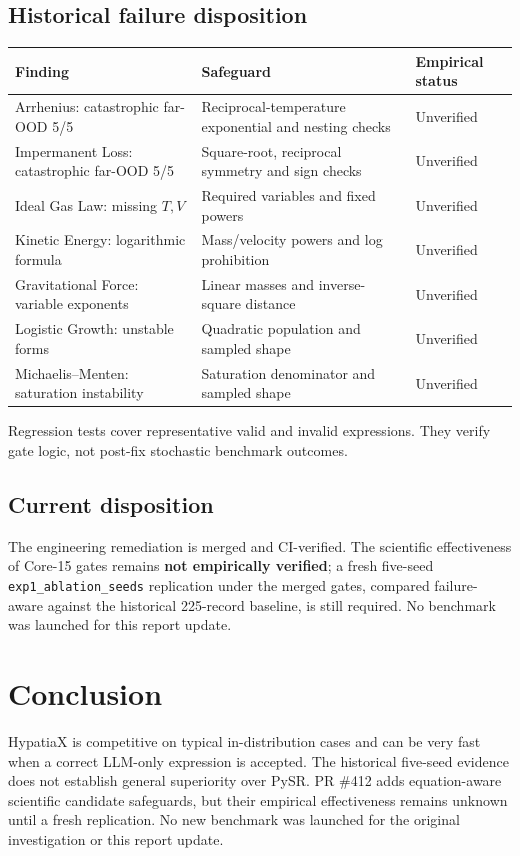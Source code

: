 \documentclass[11pt,a4paper]{article}
\begin{document}
\subsection{Historical failure disposition}
\begin{center}
\small
\begin{tabularx}{\textwidth}{p{}X p{}}
\toprule
Finding & Safeguard & Empirical status\\
\midrule
Arrhenius: catastrophic far-OOD 5/5 & Reciprocal-temperature exponential and nesting checks & Unverified\\
Impermanent Loss: catastrophic far-OOD 5/5 & Square-root, reciprocal symmetry and sign checks & Unverified\\
Ideal Gas Law: missing $T,V$ & Required variables and fixed powers & Unverified\\
Kinetic Energy: logarithmic formula & Mass/velocity powers and log prohibition & Unverified\\
Gravitational Force: variable exponents & Linear masses and inverse-square distance & Unverified\\
Logistic Growth: unstable forms & Quadratic population and sampled shape & Unverified\\
Michaelis--Menten: saturation instability & Saturation denominator and sampled shape & Unverified\\
\bottomrule
\end{tabularx}
\end{center}
Regression tests cover representative valid and invalid expressions. They verify gate logic, not post-fix stochastic benchmark outcomes.

\subsection{Current disposition}
The engineering remediation is merged and CI-verified. The scientific effectiveness of Core-15 gates remains \textbf{not empirically verified}; a fresh five-seed \texttt{exp1\_ablation\_seeds} replication under the merged gates, compared failure-aware against the historical 225-record baseline, is still required. No benchmark was launched for this report update.


\section*{Conclusion}
HypatiaX is competitive on typical in-distribution cases and can be very fast when a correct LLM-only expression is accepted. The historical five-seed evidence does not establish general superiority over PySR. PR \#412 adds equation-aware scientific candidate safeguards, but their empirical effectiveness remains unknown until a fresh replication. No new benchmark was launched for the original investigation or this report update.
\end{document}
